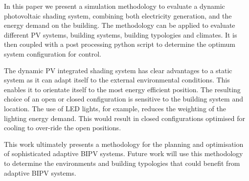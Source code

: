 
In this paper we present a simulation methodology to evaluate a dynamic photovoltaic shading system, combining both electricity generation, and the energy demand on the building. The methodology can be applied to evaluate different PV systems, building systems, building typologies and climates. It is then coupled with a post processing python script to determine the optimum system configuration for control. 

The dynamic PV integrated shading system has clear advantages to a static system as it can adapt itself to the external environmental conditions. This enables it to orientate itself to the most energy efficient position. The resulting choice of an open or closed configuration is sensitive to the building system and location. The use of LED lights, for example, reduces the weighting of the lighting energy demand. This would result in closed configurations optimised for cooling to over-ride the open positions. 

This work ultimately presents a methodology for the planning and optimisation of sophisticated adaptive BIPV systems. Future work will use this methodology to determine the environments and building typologies that could benefit from adaptive BIPV systems. 



